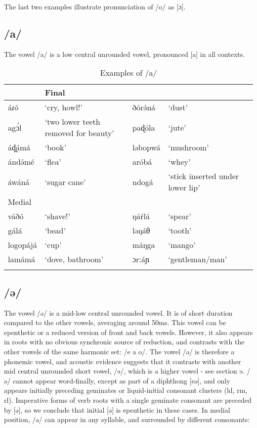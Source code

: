 The last two examples illustrate pronunciation of /o/ as [ɔ].

\subsection{/a/}

The vowel /a/ is a low central unrounded vowel, pronounced [a] in all contexts. 

\begin{table} 
\caption{Examples of /a/}	
 \label{tab:ch2:8}
\begin{tabular}[t]{lp{3.5cm}lp{3.5cm}}
\lsptoprule
\multicolumn{2}{l}{Initial} &	\multicolumn{2}{l}{Final}  \\
\midrule
áɾó	&	‘cry, howl!’						&	ðórə́ná		&	‘dust’\\
agɔ́l		&	‘two lower teeth removed for beauty’	&	paɖóla		&	‘jute’\\
ád̪ámá	&	‘book’							&	ləbopwá		&	‘mushroom’\\
ándə́mé	&	‘flea’							&	aróbá		&	‘whey’\\
áwáná	&	‘sugar cane’						&	ndogá		&	‘stick inserted under lower lip’\\
\midrule
 \multicolumn{2}{l}{Medial} & & \\
 \midrule 			
váðó	&	‘shave!’			&	ŋáŕlá	&	‘spear’\\
gálá	&	‘bead’			&	ləŋáθ	&	‘tooth’\\
logopájá	&	‘cup’			&	máŋga	&	‘mango’\\
lamámá	&	‘dove, bathroom’	&	ɔrːáɲ	&	‘gentleman/man’\\
\lspbottomrule	
\end{tabular}
\end{table}


\subsection{/ə/}

The vowel /ə/ is a mid-low central unrounded vowel. It is of short duration compared to the other vowels, averaging around 50ms. This vowel can be epenthetic or a reduced version of front and back vowels. However, it also appears in roots with no obvious synchronic source of reduction, and contrasts with the other vowels of the same harmonic set: /e a o/. The vowel /ə/ is therefore a phonemic vowel, and acoustic evidence suggests that it contrasts with another mid central unrounded short vowel, /ɘ/, which is a higher vowel - see section ɘ. /ə/ cannot appear word-finally, except as part of a diphthong [eə], and only appears initially preceding geminates or liquid-initial consonant clusters (ld, rm, rl). Imperative forms of verb roots with a single geminate consonant are preceded by [ə], so we conclude that initial [ə] is epenthetic in these cases. In medial position, /ə/ can appear in any syllable, and surrounded by different consonants:


